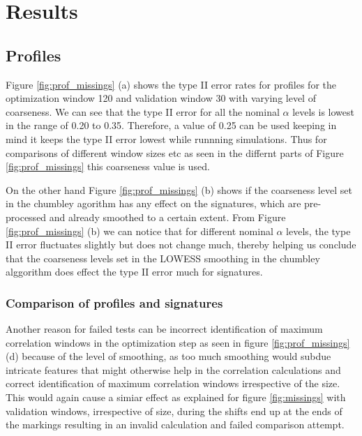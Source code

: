 \documentclass[12pt]{article}
\begin{document}
\section{Results}\label{results-1}

\subsection{Profiles}\label{profiles}

Figure \ref{fig:prof_missings} (a) shows the type II error rates for
profiles for the optimization window 120 and validation window 30 with
varying level of coarseness. We can see that the type II error for all
the nominal \(\alpha\) levels is lowest in the range of 0.20 to 0.35.
Therefore, a value of 0.25 can be used keeping in mind it keeps the type
II error lowest while runnning simulations. Thus for comparisons of
different window sizes etc as seen in the differnt parts of Figure
\ref{fig:prof_missings} this coarseness value is used.

On the other hand Figure \ref{fig:prof_missings} (b) shows if the
coarseness level set in the chumbley agorithm has any effect on the
signatures, which are pre-processed and already smoothed to a certain
extent. From Figure \ref{fig:prof_missings} (b) we can notice that for
different nominal \(\alpha\) levels, the type II error fluctuates
slightly but does not change much, thereby helping us conclude that the
coarseness levels set in the LOWESS smoothing in the chumbley alggorithm
does effect the type II error much for signatures.

\subsubsection{Comparison of profiles and
signatures}\label{comparison-of-profiles-and-signatures}

Another reason for failed tests can be incorrect identification of
maximum correlation windows in the optimization step as seen in figure
\ref{fig:prof_missings}(d) because of the level of smoothing, as too
much smoothing would subdue intricate features that might otherwise help
in the correlation calculations and correct identification of maximum
correlation windows irrespective of the size. This would again cause a
simiar effect as explained for figure \ref{fig:missings} with validation
windows, irrespective of size, during the shifts end up at the ends of
the markings resulting in an invalid calculation and failed comparison
attempt.
\end{document}

